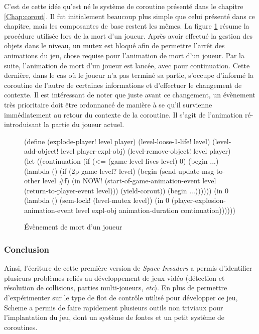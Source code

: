 \documentclass[12pt,twoside,letterpaper,francais]{book}
\newcommand{\scheme}[1]{\selectlanguage{english}{\tt #1}\selectlanguage{french}}
\begin{document}
C'est de cette idée qu'est né le système de coroutine présenté dans le
chapitre \ref{Chap:corout}. Il fut initialement beaucoup plus simple
que celui présenté dans ce chapitre, mais les composantes de base
restent les mêmes. La figure \ref{Exp:si-mort} résume la procédure
utilisée lors de la mort d'un joueur. Après avoir effectué la gestion
des objets dans le niveau, un mutex est bloqué afin de permettre
l'arrêt des animations du jeu, chose requise pour l'animation de mort
d'un joueur. Par la suite, l'animation de mort d'un joueur est lancée,
avec \scheme{continuation} pour continuation. Cette dernière, dans le
cas où le joueur n'a pas terminé sa partie, s'occupe d'informé la
coroutine de l'autre de certaines informations et d'effectuer le
changement de contexte. Il est intéressant de noter que juste avant ce
changement, un évènement très prioritaire doit être ordonnancé de
manière à se qu'il survienne immédiatement au retour du contexte de la
coroutine. Il s'agit de l'animation ré-introduisant la partie du
joueur actuel.\\

\begin{figure}[htb!]
  \begin{schemecode}
(define (explode-player! level player)
  (level-loose-1-life! level)
  (level-add-object! level player-expl-obj)
  (level-remove-object! level player)
  (let ((continuation
         (if (<= (game-level-lives level) 0)
             (begin ...)
             (lambda ()
               (if (2p-game-level? level)
                   (begin
                     (send-update-msg-to-other level \#f)
                     (in NOW! (start-of-game-animation-event
                               level (return-to-player-event level)))
                     (yield-corout))
                   (begin ...))))))
     (in 0 (lambda ()
            (sem-lock! (level-mutex level))
            (in 0 (player-explosion-animation-event
                   level expl-obj animation-duration continuation))))))
   \end{schemecode}
  \caption{Évènement de mort d'un joueur}
  \label{Exp:si-mort}
\end{figure}


\FloatBarrier
\subsubsection{Conclusion}
Ainsi, l'écriture de cette première version de \textit{Space Invaders} a permis
d'identifier plusieurs problèmes reliés au dévelop\-pement de jeux vidéo
(détection et résolution de collisions, parties multi-joueurs,
\textit{etc}). En plus de permettre d'expérimenter sur le type de flot de
contrôle utilisé pour développer ce jeu, Scheme a permis de faire
rapidement plusieurs outils non triviaux pour l'implantation du jeu,
dont un système de fontes et un petit système de coroutines.
\end{document}
